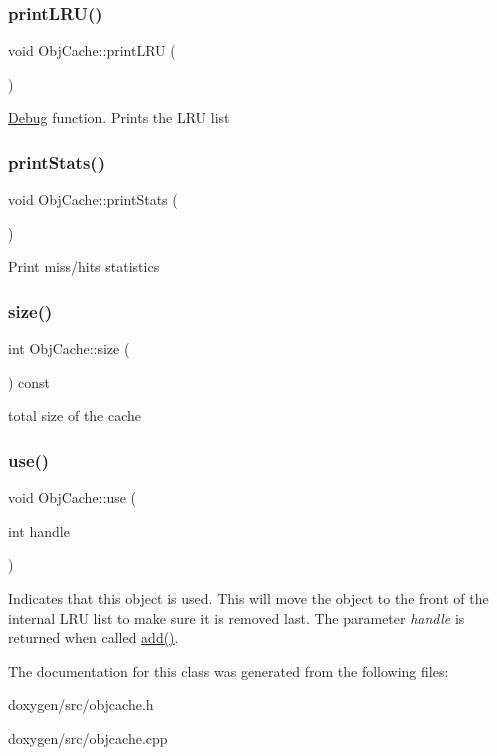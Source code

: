 \subsubsection{\texorpdfstring{printLRU()}{printLRU()}}
{\footnotesize\ttfamily void Obj\+Cache\+::print\+L\+RU (\begin{DoxyParamCaption}{ }\end{DoxyParamCaption})}

\mbox{\hyperlink{class_debug}{Debug}} function. Prints the L\+RU list \mbox{\label{class_obj_cache_a3e4ded7d3342fb02d64bd8d39466a30a}} 
\subsubsection{\texorpdfstring{printStats()}{printStats()}}
{\footnotesize\ttfamily void Obj\+Cache\+::print\+Stats (\begin{DoxyParamCaption}{ }\end{DoxyParamCaption})}

Print miss/hits statistics \mbox{\label{class_obj_cache_aea030caf627270a451507a3517584bbc}} 
\subsubsection{\texorpdfstring{size()}{size()}}
{\footnotesize\ttfamily int Obj\+Cache\+::size (\begin{DoxyParamCaption}{ }\end{DoxyParamCaption}) const\hspace{0.3cm}{\ttfamily [inline]}}

total size of the cache \mbox{\label{class_obj_cache_ac4d9eb810e8f6ca2fbd4cf058ff3fe0e}} 
\subsubsection{\texorpdfstring{use()}{use()}}
{\footnotesize\ttfamily void Obj\+Cache\+::use (\begin{DoxyParamCaption}\item[{int}]{handle }\end{DoxyParamCaption})\hspace{0.3cm}{\ttfamily [inline]}}

Indicates that this object is used. This will move the object to the front of the internal L\+RU list to make sure it is removed last. The parameter {\itshape handle} is returned when called \mbox{\hyperlink{class_obj_cache_affd025326493c40ac4e7f5b4c0c3ad9b}{add()}}. 

The documentation for this class was generated from the following files\+:\begin{DoxyCompactItemize}
\item 
doxygen/src/objcache.\+h\item 
doxygen/src/objcache.\+cpp\end{DoxyCompactItemize}

